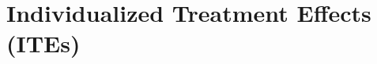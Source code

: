% 
% 
% 













\FloatBarrier


\section{Individualized Treatment Effects (ITEs)} \label{sec:methods_ite}



